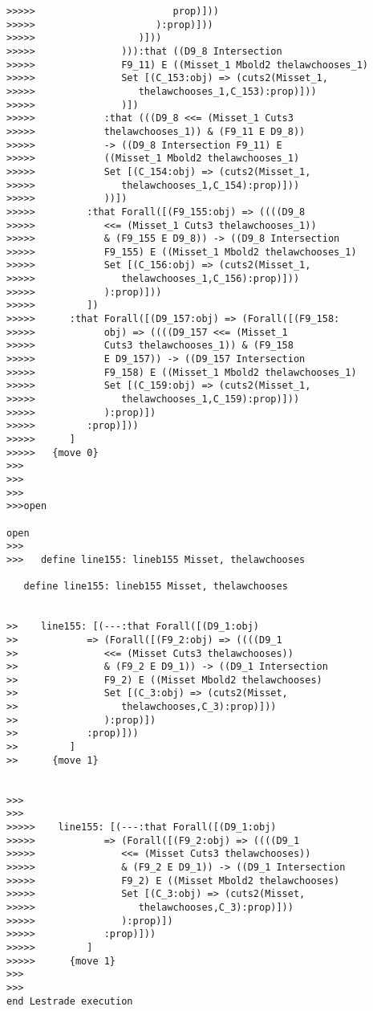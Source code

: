 \documentclass[12pt]{article}
\begin{document}
\begin{verbatim}
>>>>>                        prop)]))
>>>>>                     ):prop)]))
>>>>>                  )]))
>>>>>               ))):that ((D9_8 Intersection
>>>>>               F9_11) E ((Misset_1 Mbold2 thelawchooses_1)
>>>>>               Set [(C_153:obj) => (cuts2(Misset_1,
>>>>>                  thelawchooses_1,C_153):prop)]))
>>>>>               )])
>>>>>            :that (((D9_8 <<= (Misset_1 Cuts3
>>>>>            thelawchooses_1)) & (F9_11 E D9_8))
>>>>>            -> ((D9_8 Intersection F9_11) E
>>>>>            ((Misset_1 Mbold2 thelawchooses_1)
>>>>>            Set [(C_154:obj) => (cuts2(Misset_1,
>>>>>               thelawchooses_1,C_154):prop)]))
>>>>>            ))])
>>>>>         :that Forall([(F9_155:obj) => ((((D9_8
>>>>>            <<= (Misset_1 Cuts3 thelawchooses_1))
>>>>>            & (F9_155 E D9_8)) -> ((D9_8 Intersection
>>>>>            F9_155) E ((Misset_1 Mbold2 thelawchooses_1)
>>>>>            Set [(C_156:obj) => (cuts2(Misset_1,
>>>>>               thelawchooses_1,C_156):prop)]))
>>>>>            ):prop)]))
>>>>>         ])
>>>>>      :that Forall([(D9_157:obj) => (Forall([(F9_158:
>>>>>            obj) => ((((D9_157 <<= (Misset_1
>>>>>            Cuts3 thelawchooses_1)) & (F9_158
>>>>>            E D9_157)) -> ((D9_157 Intersection
>>>>>            F9_158) E ((Misset_1 Mbold2 thelawchooses_1)
>>>>>            Set [(C_159:obj) => (cuts2(Misset_1,
>>>>>               thelawchooses_1,C_159):prop)]))
>>>>>            ):prop)])
>>>>>         :prop)]))
>>>>>      ]
>>>>>   {move 0}
>>>
>>>
>>>
>>>open

open
>>>
>>>   define line155: lineb155 Misset, thelawchooses

   define line155: lineb155 Misset, thelawchooses


>>    line155: [(---:that Forall([(D9_1:obj)
>>            => (Forall([(F9_2:obj) => ((((D9_1
>>               <<= (Misset Cuts3 thelawchooses))
>>               & (F9_2 E D9_1)) -> ((D9_1 Intersection
>>               F9_2) E ((Misset Mbold2 thelawchooses)
>>               Set [(C_3:obj) => (cuts2(Misset,
>>                  thelawchooses,C_3):prop)]))
>>               ):prop)])
>>            :prop)]))
>>         ]
>>      {move 1}


>>>
>>>
>>>>>    line155: [(---:that Forall([(D9_1:obj)
>>>>>            => (Forall([(F9_2:obj) => ((((D9_1
>>>>>               <<= (Misset Cuts3 thelawchooses))
>>>>>               & (F9_2 E D9_1)) -> ((D9_1 Intersection
>>>>>               F9_2) E ((Misset Mbold2 thelawchooses)
>>>>>               Set [(C_3:obj) => (cuts2(Misset,
>>>>>                  thelawchooses,C_3):prop)]))
>>>>>               ):prop)])
>>>>>            :prop)]))
>>>>>         ]
>>>>>      {move 1}
>>>
>>>
end Lestrade execution
\end{verbatim}
\end{document}
